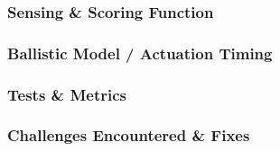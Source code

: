 \subsubsection{Sensing \& Scoring Function}
\subsubsection{Ballistic Model / Actuation Timing}
\subsubsection{Tests \& Metrics}
\subsubsection{Challenges Encountered \& Fixes}